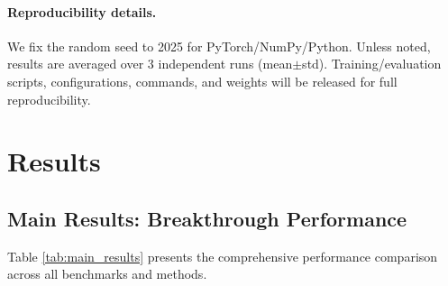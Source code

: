 \documentclass[11pt]{article}
\begin{document}
\paragraph{Reproducibility details.} We fix the random seed to 2025 for PyTorch/NumPy/Python. Unless noted, results are averaged over 3 independent runs (mean$\pm$std). Training/evaluation scripts, configurations, commands, and weights will be released for full reproducibility.

\section{Results}

\subsection{Main Results: Breakthrough Performance}

Table \ref{tab:main_results} presents the comprehensive performance comparison across all benchmarks and methods.
\end{document}
